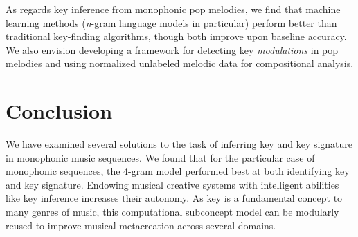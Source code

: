 \documentclass[letterpaper]{article}
\begin{document}
As regards key inference from monophonic pop melodies, we find that machine learning methods (\emph{n}-gram language models in particular) perform better than traditional key-finding algorithms, though both improve upon baseline accuracy. We also envision developing a framework for detecting key \emph{modulations} in pop melodies and using normalized unlabeled melodic data for compositional analysis. 

\section{Conclusion}

We have examined several solutions to the task of inferring key and key signature in monophonic music sequences. We found that for the particular case of monophonic sequences, the 4-gram model performed best at both identifying key and key signature. Endowing musical creative systems with intelligent abilities like key inference increases their autonomy. As key is a fundamental concept to many genres of music, this computational subconcept model can be modularly reused to improve musical metacreation across several domains.



\end{document}
